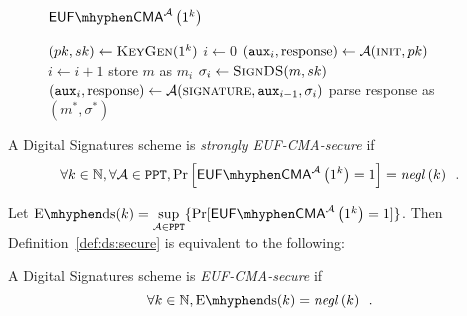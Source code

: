   \begin{figure}[!htbp]
    \begin{gamebox}{$\mathsf{EUF \mhyphen CMA}^{\adversary}\left(1^k\right)$}
      \begin{algorithmic}[1]
        \State $(pk, sk) \gets \textsc{KeyGen}(1^k)$
        \State $i \gets 0$
        \State $(\mathtt{aux}_i, \mathrm{response}) \gets
        \mathcal{A}(\textsc{init}, pk)$
          \State $i \gets i + 1$
          \State store $m$ as $m_i$
          \State $\sigma_i \gets \textsc{SignDS}(m, sk)$
          \State $(\mathtt{aux}_i, \mathrm{response}) \gets
          \mathcal{A}(\textsc{signature}, \mathtt{aux}_{i-1}, \sigma_i)$
        \EndWhile
        \State parse response as $(m^*, \sigma^*)$
          \State {}
        \Else
          \State {}
        \EndIf
      \end{algorithmic}
    \end{gamebox}
    \caption{}
    \label{game:ds}
  \end{figure}
  \begin{definition}
    \label{def:ds:secure}
    A Digital Signatures scheme is \emph{strongly \textsf{EUF-CMA}-secure} if
    \begin{equation*}
      \forall k \in \mathbb{N}, \forall \adversary \in \mathtt{PPT},
      \Pr\left[\mathsf{EUF \mhyphen CMA}^{\adversary}\left(1^k\right) =
      1\right] = \mathit{negl}\left(k\right) \enspace.
    \end{equation*}
  \end{definition}

  Let $\mathrm{E \mhyphen ds}(k) = \underset{\adversary \in
  \mathtt{PPT}}{\sup}\{\Pr[\mathsf{EUF \mhyphen
  CMA}^{\adversary}\left(1^k\right) = 1]\}$. Then
  Definition~\ref{def:ds:secure} is equivalent to the following:

  \begin{definition}
    \label{def:ds:secure:sup}
    A Digital Signatures scheme is \emph{\textsf{EUF-CMA}-secure} if
    \begin{equation*}
      \forall k \in \mathbb{N}, \mathrm{E \mhyphen ds}(k) =
      \mathit{negl}\left(k\right) \enspace.
    \end{equation*}
  \end{definition}
